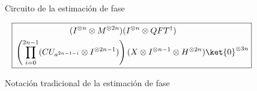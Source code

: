 \documentclass[10pt,conference,a4paper]{IEEEtran}
\begin{document}
    \begin{figure}[htb!]
        \begin{center}
            \caption{Circuito de la estimación de fase} \label{fig:shor}
        \end{center}
    \end{figure}

    \begin{figure}[htb!]
        \begin{equation*}
            \boxed{
                \begin{aligned}
                    &\hspace{23mm}(I^{\otimes n}\otimes M^{\otimes 2n})(I^{\otimes n}\otimes QFT^{\dagger})\\
                    &\left(\displaystyle\prod_{i=0}^{2n-1}(CU_{a^{2n-1-i}}\otimes I^{\otimes 2n-1})\right)(X\otimes I^{\otimes n-1}\otimes H^{\otimes 2n})\ket{0}^{\otimes 3n}
                \end{aligned}}
        \end{equation*}
        \caption{Notación tradicional  de la estimación de fase}
        \label{Fig10}
    \end{figure}
\end{document}
